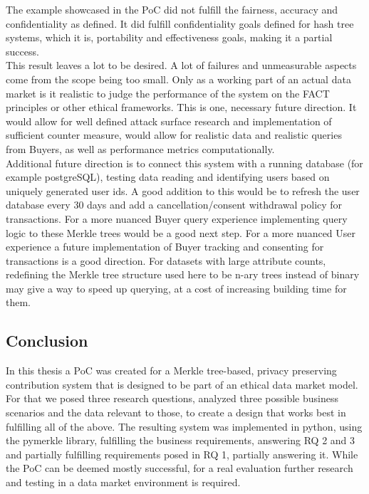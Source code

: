 \documentclass[english, 12pt, a4paper, sci, utf8, a-2b, online]{aaltothesis}
\theoremstyle{change}
\theoremstyle{theoremstyle}
\begin{document}
\begin{itemize}
\end{itemize}
The example showcased in the PoC did not fulfill the fairness, accuracy and confidentiality as defined. It did fulfill confidentiality goals defined for hash tree systems, which it is, portability and effectiveness goals, making it a partial success.\\
This result leaves a lot to be desired. A lot of failures and unmeasurable aspects come from the scope being too small. Only as a working part of an actual data market is it realistic to judge the performance of the system on the FACT principles or other ethical frameworks. This is one, necessary future direction. It would allow for well defined attack surface research and implementation of sufficient counter measure, would allow for realistic data and realistic queries from Buyers, as well as performance metrics computationally.\\
Additional future direction is to connect this system with a running database (for example postgreSQL), testing data reading and identifying users based on uniquely generated user ids. A good addition to this would be to refresh the user database every 30 days and add a cancellation/consent withdrawal policy for transactions. For a more nuanced Buyer query experience implementing query logic to these Merkle trees would be a good next step. For a more nuanced User experience a future implementation of Buyer tracking and consenting for transactions is a good direction. For datasets with large attribute counts, redefining the Merkle tree structure used here to be n-ary trees instead of binary may give a way to speed up querying, at a cost of increasing building time for them.
\subsection{Conclusion}
In this thesis a PoC was created for a Merkle tree-based, privacy preserving contribution system that is designed to be part of an ethical data market model. For that we posed three research questions, analyzed three possible business scenarios and the data relevant to those, to create a design that works best in fulfilling all of the above. The resulting system was implemented in python, using the pymerkle library, fulfilling the business requirements, answering RQ 2 and 3 and partially fulfilling requirements posed in RQ 1, partially answering it. While the PoC can be deemed mostly successful, for a real evaluation further research and testing in a data market environment is required.
\end{document}
